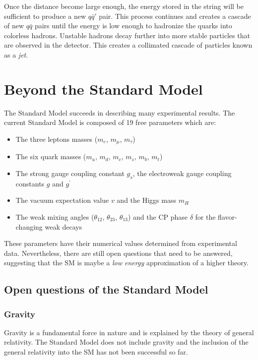 Once the distance become large enough, the energy stored in the string will be sufficient to produce a new $q\bar{q}'$ pair. This process continues and creates a cascade of new $q\bar{q}$ pairs until the energy is low enough to hadronize the quarks into colorless hadrons. Unstable hadrons decay further into more stable particles that are observed in the detector. This creates a collimated cascade of particles known as a \textit{jet}.

\section{Beyond the Standard Model}
\label{sec:BeyondSM}

The Standard Model succeeds in describing many experimental results. The current Standard Model is composed of 19 free parameters which are:

\begin{itemize}
  \item The three leptons masses ($m_e$, $m_{\mu}$, $m_{\tau}$)
  \item The six quark masses ($m_u$, $m_d$, $m_c$, $m_s$, $m_b$, $m_t$)
  \item The strong gauge coupling constant $g_s$, the electroweak gauge coupling constants $g$ and $g^{\prime}$
  \item The vacuum expectation value $v$ and the Higgs mass $m_H$
  \item The weak mixing angles ($\theta_{12}$, $\theta_{23}$, $\theta_{13}$) and the CP phase $\delta$ for the flavor-changing weak decays \cite{Kobayashi:1973pt}
\end{itemize}

These parameters have their numerical values determined from experimental data. Nevertheless, there are still open questions that need to be answered, suggesting that the SM is maybe a \textit{low energy} approximation of a higher theory.

\subsection{Open questions of the Standard Model}

\subsubsection*{Gravity}

Gravity is a fundamental force in nature and is explained by the theory of general relativity. The Standard Model does not include gravity and the inclusion of the general relativity into the SM has not been successful so far.

